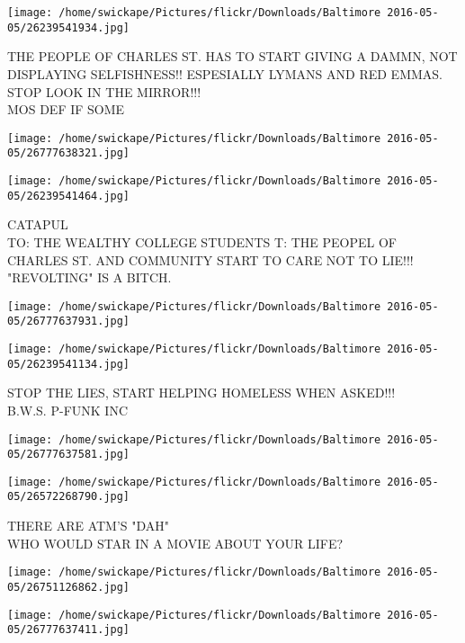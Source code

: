 \documentclass[10pt,letterpaper]{article}
\begin{document}
\vspace{0.25in}
\texttt{[image: /home/swickape/Pictures/flickr/Downloads/Baltimore 2016-05-05/26239541934.jpg]}

THE PEOPLE OF CHARLES ST. HAS TO START GIVING A DAMMN, NOT DISPLAYING SELFISHNESS!! ESPESIALLY LYMANS AND RED EMMAS.  STOP LOOK IN THE MIRROR!!!\\
MOS DEF IF SOME\\
\pagebreak

\texttt{[image: /home/swickape/Pictures/flickr/Downloads/Baltimore 2016-05-05/26777638321.jpg]}

\vspace{0.25in}
\texttt{[image: /home/swickape/Pictures/flickr/Downloads/Baltimore 2016-05-05/26239541464.jpg]}

CATAPUL\\
TO: THE WEALTHY COLLEGE STUDENTS   T: THE PEOPEL OF CHARLES ST. AND COMMUNITY START TO CARE NOT TO LIE!!! "REVOLTING" IS A BITCH.\\
\pagebreak

\texttt{[image: /home/swickape/Pictures/flickr/Downloads/Baltimore 2016-05-05/26777637931.jpg]}

\vspace{0.25in}
\texttt{[image: /home/swickape/Pictures/flickr/Downloads/Baltimore 2016-05-05/26239541134.jpg]}

STOP THE LIES, START HELPING HOMELESS WHEN ASKED!!!\\
B.W.S. P{-}FUNK INC\\
\pagebreak

\texttt{[image: /home/swickape/Pictures/flickr/Downloads/Baltimore 2016-05-05/26777637581.jpg]}

\vspace{0.25in}
\texttt{[image: /home/swickape/Pictures/flickr/Downloads/Baltimore 2016-05-05/26572268790.jpg]}

THERE ARE ATM'S "DAH"\\
WHO WOULD STAR IN A MOVIE ABOUT YOUR LIFE?\\
\pagebreak

\texttt{[image: /home/swickape/Pictures/flickr/Downloads/Baltimore 2016-05-05/26751126862.jpg]}

\vspace{0.25in}
\texttt{[image: /home/swickape/Pictures/flickr/Downloads/Baltimore 2016-05-05/26777637411.jpg]}
\end{document}
